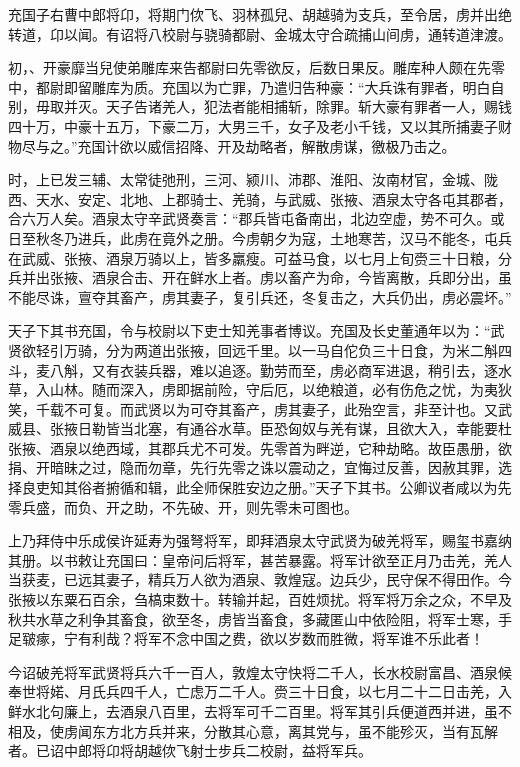 \documentclass[12pt,UTF8]{ctexbook}
\begin{document}
充国子右曹中郎将卬，将期门佽飞、羽林孤兒、胡越骑为支兵，至令居，虏并出绝转道，卬以闻。有诏将八校尉与骁骑都尉、金城太守合疏捕山间虏，通转道津渡。



初，、开豪靡当兒使弟雕库来告都尉曰先零欲反，后数日果反。雕库种人颇在先零中，都尉即留雕库为质。充国以为亡罪，乃遣归告种豪：“大兵诛有罪者，明白自别，毋取并灭。天子告诸羌人，犯法者能相捕斩，除罪。斩大豪有罪者一人，赐钱四十万，中豪十五万，下豪二万，大男三千，女子及老小千钱，又以其所捕妻子财物尽与之。”充国计欲以威信招降、开及劫略者，解散虏谋，徼极乃击之。



时，上已发三辅、太常徒弛刑，三河、颍川、沛郡、淮阳、汝南材官，金城、陇西、天水、安定、北地、上郡骑士、羌骑，与武威、张掖、酒泉太守各屯其郡者，合六万人矣。酒泉太守辛武贤奏言：“郡兵皆屯备南出，北边空虚，势不可久。或日至秋冬乃进兵，此虏在竟外之册。今虏朝夕为寇，土地寒苦，汉马不能冬，屯兵在武威、张掖、酒泉万骑以上，皆多羸瘦。可益马食，以七月上旬赍三十日粮，分兵并出张掖、酒泉合击、开在鲜水上者。虏以畜产为命，今皆离散，兵即分出，虽不能尽诛，亶夺其畜产，虏其妻子，复引兵还，冬复击之，大兵仍出，虏必震坏。”



天子下其书充国，令与校尉以下吏士知羌事者博议。充国及长史董通年以为：“武贤欲轻引万骑，分为两道出张掖，回远千里。以一马自佗负三十日食，为米二斛四斗，麦八斛，又有衣装兵器，难以追逐。勤劳而至，虏必商军进退，稍引去，逐水草，入山林。随而深入，虏即据前险，守后厄，以绝粮道，必有伤危之忧，为夷狄笑，千载不可复。而武贤以为可夺其畜产，虏其妻子，此殆空言，非至计也。又武威县、张掖日勒皆当北塞，有通谷水草。臣恐匈奴与羌有谋，且欲大入，幸能要杜张掖、酒泉以绝西域，其郡兵尤不可发。先零首为畔逆，它种劫略。故臣愚册，欲捐、开暗昧之过，隐而勿章，先行先零之诛以震动之，宜悔过反善，因赦其罪，选择良吏知其俗者捬循和辑，此全师保胜安边之册。”天子下其书。公卿议者咸以为先零兵盛，而负、开之助，不先破、开，则先零未可图也。



上乃拜侍中乐成侯许延寿为强弩将军，即拜酒泉太守武贤为破羌将军，赐玺书嘉纳其册。以书敕让充国曰：皇帝问后将军，甚苦暴露。将军计欲至正月乃击羌，羌人当获麦，已远其妻子，精兵万人欲为酒泉、敦煌寇。边兵少，民守保不得田作。今张掖以东粟石百余，刍槁束数十。转输并起，百姓烦扰。将军将万余之众，不早及秋共水草之利争其畜食，欲至冬，虏皆当畜食，多藏匿山中依险阻，将军士寒，手足皲瘃，宁有利哉？将军不念中国之费，欲以岁数而胜微，将军谁不乐此者！



今诏破羌将军武贤将兵六千一百人，敦煌太守快将二千人，长水校尉富昌、酒泉候奉世将婼、月氏兵四千人，亡虑万二千人。赍三十日食，以七月二十二日击羌，入鲜水北句廉上，去酒泉八百里，去将军可千二百里。将军其引兵便道西并进，虽不相及，使虏闻东方北方兵并来，分散其心意，离其党与，虽不能殄灭，当有瓦解者。已诏中郎将卬将胡越佽飞射士步兵二校尉，益将军兵。
\end{document}
